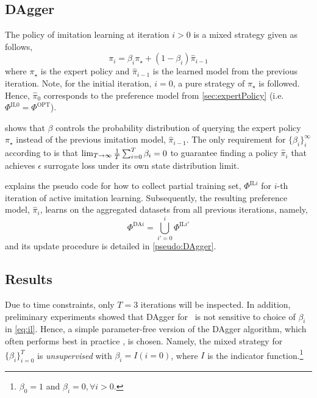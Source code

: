 \documentclass[smallextended]{svjour3}
\begin{document}
	\subsection{DAgger}
	The policy of imitation learning at iteration $i>0$ is a mixed strategy given 
	as follows, 
	\begin{equation}\label{eq:il}
	\pi_i = \beta_i\pi_\star + (1-\beta_i)\hat{\pi}_{i-1}
	\end{equation}
	where $\pi_\star$ is the expert policy and $\hat{\pi}_{i-1}$ is the learned 
	model from the previous iteration. 
	Note, for the initial iteration, $i=0$, a pure strategy of $\pi_\star$ is 
	followed. Hence, $\hat{\pi}_0$ corresponds to the preference model from 
	\cref{sec:expertPolicy} (i.e. $\Phi^{\text{IL}0}=\Phi^{\text{OPT}}$). 
	
	 shows that $\beta$ controls the probability distribution of 
	querying the expert policy $\pi_\star$ instead of the previous imitation model, 
	$\hat{\pi}_{i-1}$.  
	The only requirement for $\{\beta_i\}_i^\infty$ according to \cite{RossGB11} is 
	that $\limit{\frac{1}{T}\sum_{i=0}^T\beta_i}{T\to\infty}{0}$ to guarantee 
	finding a policy $\hat{\pi}_i$ that achieves $\epsilon$ surrogate loss under 
	its own state distribution limit.
	
	 explains the pseudo code for how to collect 
	partial training set, $\Phi^{\text{IL}i}$ for $i$-th iteration of active 
	imitation learning.
	Subsequently, the resulting preference model, $\hat{\pi}_i$, learns on the 
	aggregated datasets from all previous iterations, namely,  
	\begin{equation}\label{eq:DAgger}
	\Phi^{\text{DA}i}=\bigcup_{i'=0}^{i}\Phi^{\text{IL}i'}
	\end{equation}
	and its update procedure is detailed in \cref{pseudo:DAgger}.
	
	
	
	
	\subsection{Results}\label{sec:ail:expr}
	Due to time constraints, only $T=3$ iterations will be inspected.
	In addition, preliminary experiments showed that DAgger for \jsp\ is not 
	sensitive to choice of $\beta_i$ in \cref{eq:il}. 
	Hence, a simple parameter-free version of the DAgger algorithm, which often 
	performs best in practice \cite{RossGB11}, is chosen. 
	Namely, the mixed strategy for $\{\beta_i\}_{i=0}^T$ is \emph{unsupervised} 
	with $\beta_i=I(i=0)$, where $I$ is the indicator 
	function.\footnote{$\beta_0=1$ and $\beta_i=0,\forall i>0$.}
	
\end{document}
